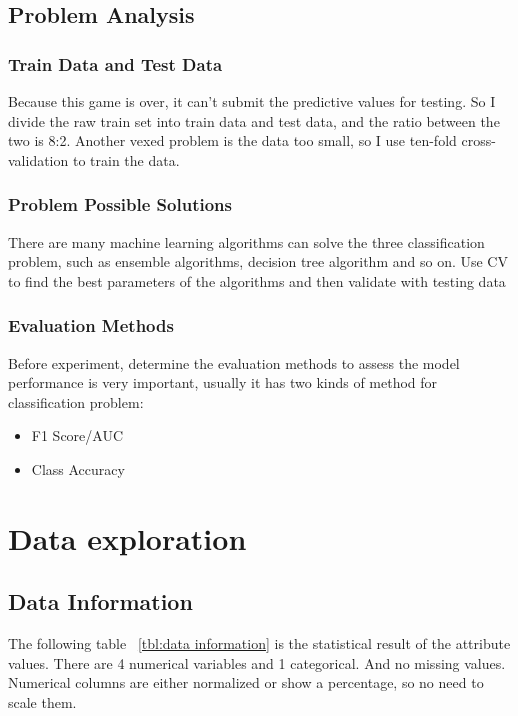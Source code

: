 \subsection{Problem Analysis}

\subsubsection{Train Data and Test Data}


Because this game is over, 
it can't submit the predictive values for testing. 
So I divide the raw train set into train data and test data, 
and the ratio between the two is 8:2. 
Another vexed problem is the data too small, 
so I use ten-fold cross-validation 
to train the data.


\subsubsection{Problem Possible Solutions}


There are many machine learning algorithms 
can solve the three classification problem,
such as ensemble algorithms,
decision tree algorithm and so on.
Use CV to find the best parameters of the algorithms 
and then validate with testing data 


\subsubsection{Evaluation Methods}


Before experiment, determine the evaluation methods
to assess the model performance is very important,
usually it has two kinds of method for classification problem:

\begin{itemize}
	\item F1 Score/AUC
	\item Class Accuracy
\end{itemize} 


\section{Data exploration} \label{sec-data_exploration}

\subsection{Data Information}


The following table ~\cref{tbl:data information}
is the statistical result of the attribute values.
There are 4 numerical variables and 1 categorical. 
And no missing values.
Numerical columns are either normalized or show a percentage, 
so no need to scale them. 


